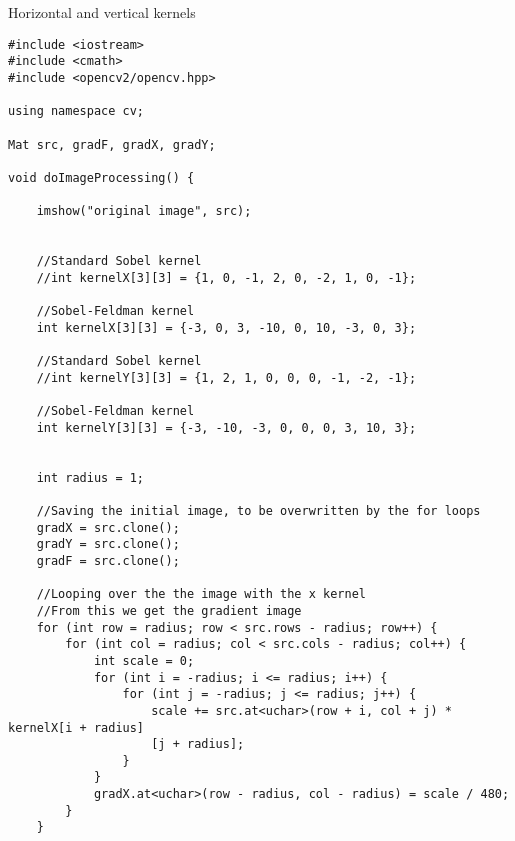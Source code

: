 \begin{listing}[H]
    	\caption{Horizontal and vertical kernels}
    	\label{listing:code1}
    	\begin{verbatim}
#include <iostream>
#include <cmath>
#include <opencv2/opencv.hpp>

using namespace cv;

Mat src, gradF, gradX, gradY;

void doImageProcessing() {
	
	imshow("original image", src);
	
	
	//Standard Sobel kernel
	//int kernelX[3][3] = {1, 0, -1, 2, 0, -2, 1, 0, -1};
	
	//Sobel-Feldman kernel
	int kernelX[3][3] = {-3, 0, 3, -10, 0, 10, -3, 0, 3};
	
	//Standard Sobel kernel
	//int kernelY[3][3] = {1, 2, 1, 0, 0, 0, -1, -2, -1};
	
	//Sobel-Feldman kernel
	int kernelY[3][3] = {-3, -10, -3, 0, 0, 0, 3, 10, 3};
	
	
	int radius = 1;
	
	//Saving the initial image, to be overwritten by the for loops
	gradX = src.clone();
	gradY = src.clone();
	gradF = src.clone();
	
	//Looping over the the image with the x kernel
	//From this we get the gradient image
	for (int row = radius; row < src.rows - radius; row++) {
		for (int col = radius; col < src.cols - radius; col++) {
			int scale = 0;
			for (int i = -radius; i <= radius; i++) {
				for (int j = -radius; j <= radius; j++) {
					scale += src.at<uchar>(row + i, col + j) * kernelX[i + radius]
					[j + radius];
				}
			}
			gradX.at<uchar>(row - radius, col - radius) = scale / 480;
		}
	}
    	\end{verbatim}
    \end{listing}


